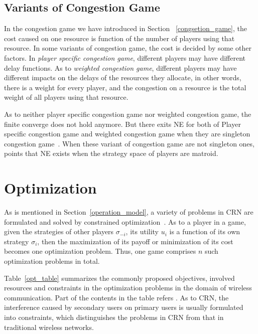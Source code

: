 \subsection{Variants of Congestion Game}
In the congestion game we have introduced in Section ~\ref{congsetion_game}, the cost caused on one resource is function of the number of players using that resource.
In some variants of congestion game, the cost is decided by some other factors.
In \textit{player specific congestion game}, different players may have different delay functions.
As to \textit{weighted congestion game}, different players may have different impacts on the delays of the resources they allocate, in other words, there is a weight for every player, and the congestion on a resource is the total weight of all players using that resource.

As to neither player specific congestion game nor weighted congestion game, the finite converge does not hold anymore.
But there exits NE for both of Player specific congestion game and weighted congestion game when they are singleton congestion game~\cite{Milchtaich1996111, FKKMS02}.
When these variant of congestion game are not singleton ones, \cite{Ackermann06purenash} points that NE exists when the strategy space of players are matroid.








\section{Optimization}

As is mentioned in Section~\ref{operation_model}, a variety of problems in CRN are formulated and solved by constrained optimization~\cite{cacao_ca_2011, fuzzy_decision_09, resourceAllocation_imperfectSensing_2012}.
As to a player in a game, given the strategies of other players $\sigma_{-i}$, its utility $u_i$ is a function of its own strategy $\sigma_i$, then the maximization of its payoff or minimization of its cost becomes one optimization problem.
Thus, one game comprises $n$ such optimization problems in total.

Table~\ref{opt_table} summarizes the commonly proposed objectives, involved resources and constraints in the optimization problems in the domain of wireless communication.
Part of the contents in the table refers \cite{Han:2008:RAW:1457343}.
As to CRN, the interference caused by secondary users on primary users is usually formulated into constraints, which distinguishes the problems in CRN from that in traditional wireless networks. 

